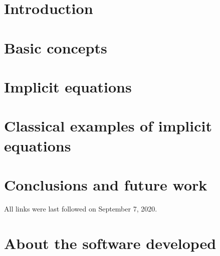 \documentclass[
  fontsize=12pt,
  a4paper,  %
  twoside,  %
  bibliography=totoc,
  headsepline,
  cleardoublepage=empty,
  draft=false
]{scrbook}
\theoremstyle{nonumberplain}
\begin{document}
\chapter{Introduction}


\chapter{Basic concepts}
\label{ch:basic}


\chapter{Implicit equations}
\label{ch:implicit}


\chapter{Classical examples of implicit equations}
\label{ch:examples}


\chapter{Conclusions and future work}



\printnoidxglossaries
{}
\cleardoublepage

%
%


\printbibliography

\noindent All links were last followed on September 7, 2020.

\appendix
\chapter{About the software developed}
\label{app:software}

\end{document}

